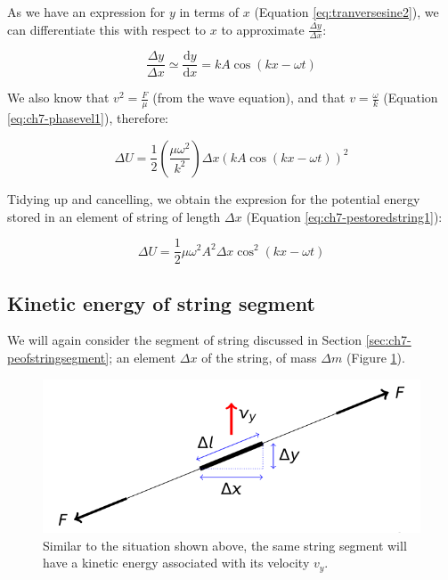 \documentclass[
]{book}
\begin{document}
As we have an expression for \(y\) in terms of \(x\) (Equation \eqref{eq:tranversesine2}), we can differentiate this with respect to \(x\) to approximate \(\frac{\Delta y}{\Delta x}\):

\begin{equation}
\frac{\Delta y}{\Delta x} \simeq \frac{\mathrm{d} y}{\mathrm{d} x} = kA \cos (kx - \omega t)
\end{equation}

We also know that \(v^2 = \frac{F}{\mu}\) (from the wave equation), and that \(v = \frac{\omega}{k}\) (Equation \eqref{eq:ch7-phasevel1}), therefore:

\begin{equation}
\Delta U = \frac{1}{2} \left( \frac{\mu \omega^2}{k^2} \right) \Delta x \left( kA \cos (kx - \omega t) \right)^2
\end{equation}

Tidying up and cancelling, we obtain the expresion for the potential energy stored in an element of string of length \(\Delta x\) (Equation \eqref{eq:ch7-pestoredstring1}):

\begin{equation}
\Delta U = \frac{1}{2} \mu \omega^2 A^2 \Delta x \cos^2(kx-\omega t)
\label{eq:ch7-pestoredstring1}
\end{equation}

\hypertarget{sec:ch7-keofstringsegment}{%
\subsection{Kinetic energy of string segment}\label{sec:ch7-keofstringsegment}}

We will again consider the segment of string discussed in Section \ref{sec:ch7-peofstringsegment}; an element \(\Delta x\) of the string, of mass \(\Delta m\) (Figure \ref{fig:ch7-kestringsegment}).

\begin{figure}

{\centering \includegraphics[width=0.7\linewidth]{visualisations/LaTeX/ch7-keofstringsegment} 

}

\caption{Similar to the situation shown above, the same string segment will have a kinetic energy associated with its velocity $v_y$.}\label{fig:ch7-kestringsegment}
\end{figure}
\end{document}
